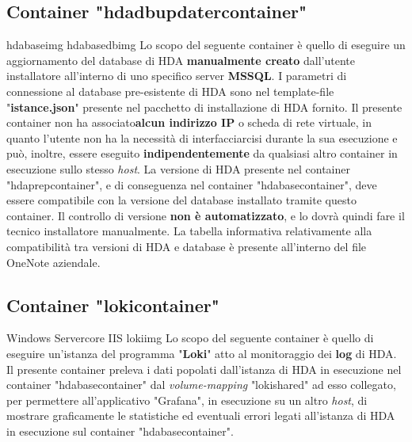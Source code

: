 \subsection{Container "hdadbupdatercontainer"}
\begin{namespacedesc}
	 {hdabaseimg}
	 {hdabasedbimg}
	 {Lo scopo del seguente container è quello di eseguire un aggiornamento del database di HDA \textbf{manualmente creato} dall'utente installatore all'interno di uno specifico server \textbf{MSSQL}. I parametri di connessione al database pre-esistente di HDA sono nel template-file "\textbf{istance.json}" presente nel pacchetto di installazione di HDA fornito.
Il presente container non ha associato\textbf{alcun indirizzo IP} o scheda di rete virtuale, in quanto l'utente non ha la necessità di interfacciarcisi durante la sua esecuzione e può, inoltre, essere eseguito \textbf{indipendentemente} da qualsiasi altro container in esecuzione sullo stesso \textit{host}.
La versione di HDA presente nel container "hdaprepcontainer", e di conseguenza nel container "hdabasecontainer", deve essere compatibile con la versione del database installato tramite questo container. Il controllo di versione \textbf{non è automatizzato}, e lo dovrà quindi fare il tecnico installatore manualmente. La tabella informativa relativamente alla compatibilità tra versioni di HDA e database è presente all'interno del file OneNote aziendale.  
}
\end{namespacedesc}

\subsection{Container "lokicontainer"}
\begin{namespacedesc}
	 {Windows Servercore IIS}
	 {lokiimg}
	 {Lo scopo del seguente container è quello di eseguire un'istanza del programma "\textbf{Loki}" atto al monitoraggio dei \textbf{log} di HDA. Il presente container preleva i dati popolati dall'istanza di HDA in esecuzione nel container "hdabasecontainer" dal \textit{volume-mapping} "lokishared" ad esso collegato, per permettere all'applicativo "Grafana", in esecuzione su un altro \textit{host}, di mostrare graficamente le statistiche ed eventuali errori legati all'istanza di HDA in esecuzione sul container "hdabasecontainer".}
\end{namespacedesc}

